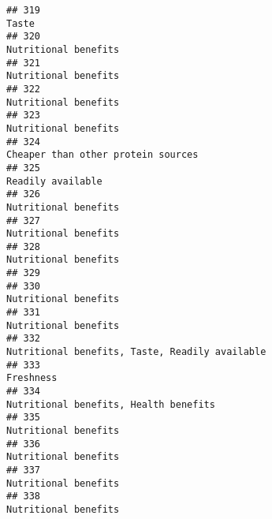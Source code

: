 \documentclass[
]{article}
\begin{document}
\begin{verbatim}
## 319                                                                                                                      Taste
## 320                                                                                                       Nutritional benefits
## 321                                                                                                       Nutritional benefits
## 322                                                                                                       Nutritional benefits
## 323                                                                                                       Nutritional benefits
## 324                                                                                         Cheaper than other protein sources
## 325                                                                                                          Readily available
## 326                                                                                                       Nutritional benefits
## 327                                                                                                       Nutritional benefits
## 328                                                                                                       Nutritional benefits
## 329                                                                                                                           
## 330                                                                                                       Nutritional benefits
## 331                                                                                                       Nutritional benefits
## 332                                                                             Nutritional benefits, Taste, Readily available
## 333                                                                                                                  Freshness
## 334                                                                                      Nutritional benefits, Health benefits
## 335                                                                                                       Nutritional benefits
## 336                                                                                                       Nutritional benefits
## 337                                                                                                       Nutritional benefits
## 338                                                                                                       Nutritional benefits

\end{verbatim}
\end{document}
